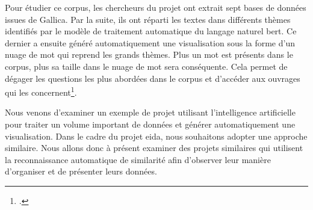 Pour étudier ce corpus, les chercheurs du projet ont extrait sept bases de données issues de Gallica. Par la suite, ils ont réparti les textes dans différents thèmes identifiés par le modèle de traitement automatique du langage naturel \gls{bert}. Ce dernier a ensuite généré automatiquement une visualisation sous la forme d'un nuage de mot qui reprend les grands thèmes. Plus un mot est présents dans le corpus, plus sa taille dans le nuage de mot sera conséquente. Cela permet de dégager les questions les plus abordées dans le corpus et d'accéder aux ouvrages qui les concernent\footcite{griveauVisualisationDonneesAu2025}.

Nous venons d'examiner un exemple de projet utilisant l'intelligence artificielle pour traiter un volume important de données et générer automatiquement une visualisation. Dans le cadre du projet \gls{eida}, nous souhaitons adopter une approche similaire. Nous allons donc à présent examiner des projets similaires qui utilisent la reconnaissance automatique de similarité afin d'observer leur manière d'organiser et de présenter leurs données.
